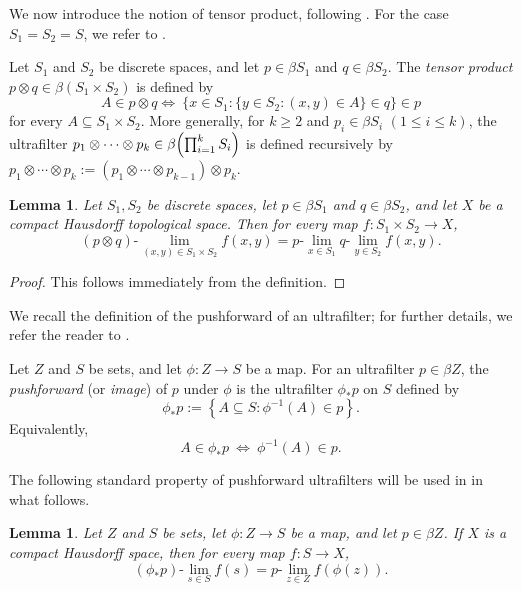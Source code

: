 \documentclass[11pt]{amsart}
\newtheorem{lemma}[theorem]{Lemma}
\theoremstyle{definition}
\theoremstyle{remark}
\begin{document}
 

 We now introduce the notion of tensor product, following \cite{Luperi Baglini-2019}. For the case $S_1=S_2=S$, we refer to \cite{HindmanStrauss2012}.

 Let $S_1$ and $S_2$ be discrete spaces, and let $p\in\beta  S_1$ and $q\in\beta  S_2$. The \emph{tensor product} $p\otimes q\in\beta( S_1 \times  S_2)$ is defined by
\[
A\in p\otimes q \Longleftrightarrow\ 
\bigl\{x\in  S_1:\{y\in S_2:(x,y)\in A\}\in q\bigr\}\in p
\]
for every $A\subseteq  S_1 \times S_2$.
More generally, for $k\geq2$ and $p_i\in\beta S_i$ $(1\leq i\leq k)$,
the ultrafilter $p_1\otimes\cdots\otimes p_k \in
\beta\Bigl(\prod_{i=1}^k S_i\Bigr)$
is defined recursively by $p_1\otimes\cdots\otimes p_k :=(p_1\otimes\cdots\otimes p_{k-1})\otimes p_k$.
 



 


\begin{lemma}
Let $S_1, S_2$ be discrete spaces, let $p\in \beta S_1$ and $q\in \beta S_2$, and let $X$ be a compact Hausdorff topological space.
Then for every map $f:S_1\times S_2\to X$,
\[
(p\otimes q)\text{-}\lim_{(x,y)\in S_1\times S_2}f(x,y)
=p\text{-}\lim_{x\in S_1}q\text{-}\lim_{y\in S_2}f(x,y).
\]
\end{lemma}

\begin{proof}
 This follows immediately from the definition.
\end{proof}

 We recall the definition of the pushforward of an ultrafilter; for further details, we refer the reader to \cite{Benhamou2024, Lurie}.
 
 
Let $Z$ and $S$ be sets, and let $\phi:Z\to S$ be a map. For an ultrafilter $p\in\beta Z$, the \emph{pushforward} (or \emph{image}) of $p$ under $\phi$ is the ultrafilter
$\phi_*p$ on $S$ defined by
\[
\phi_*p:=\left\{A\subseteq S:\phi^{-1}(A)\in p\right\}.
\]
Equivalently,
\[
A\in\phi_*p\ \Longleftrightarrow\  \phi^{-1}(A)\in p.
\]

 The following standard property of pushforward ultrafilters will be used in in what follows.
\begin{lemma} \label{pushforward}
Let $Z$ and $S$ be sets, let $\phi:Z\to S$ be a map,
and let $p\in\beta Z$. If $X$ is a compact Hausdorff space,
then for every map $f:S\to X$,
\[
(\phi_*p)\text{-}\lim_{s\in S}f(s)
=p\text{-}\lim_{z\in Z}f(\phi(z)).
\]
\end{lemma}
\end{document}
